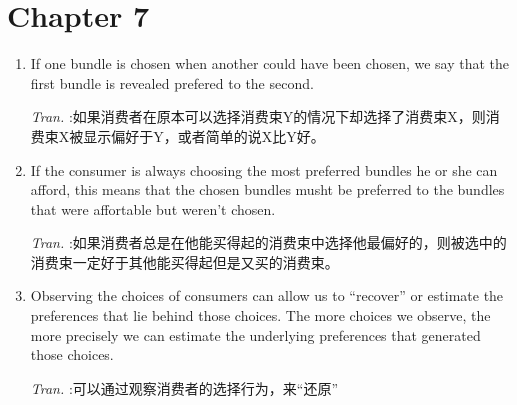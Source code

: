 \documentclass[11pt]{article}
\begin{document}
\section{Chapter 7}
\label{sec:org97771ed}
\begin{enumerate}
\item If one bundle is chosen when another could have been chosen, we say that the first bundle is revealed prefered to the second.

\emph{Tran.} :如果消费者在原本可以选择消费束Y的情况下却选择了消费束X，则消费束X被显示偏好于Y，或者简单的说X比Y好。

\item If the consumer is always choosing the most preferred bundles he or she can afford, this means that the chosen bundles musht be preferred to the bundles that were affortable but weren't chosen.

\emph{Tran.} :如果消费者总是在他能买得起的消费束中选择他最偏好的，则被选中的消费束一定好于其他能买得起但是又买的消费束。

\item Observing the choices of consumers can allow us to ``recover'' or estimate the preferences that lie behind those choices. The more choices we observe, the more precisely we can estimate the underlying preferences that generated those choices.

\emph{Tran.} :可以通过观察消费者的选择行为，来``还原''
\end{enumerate}
\end{document}
